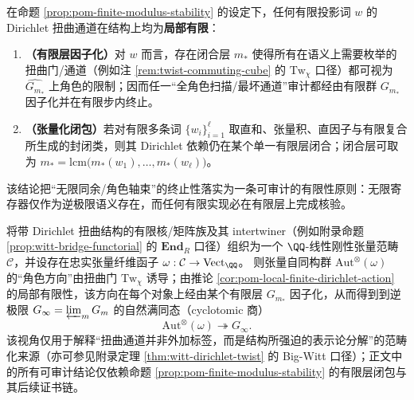 \begin{corollary}\label{cor:pom-local-finite-dirichlet-action}
在命题 \ref{prop:pom-finite-modulus-stability} 的设定下，任何有限投影词 \(w\) 的 Dirichlet 扭曲通道在结构上均为\textbf{局部有限}：
\begin{enumerate}
  \item \textbf{（有限层因子化）}对 \(w\) 而言，存在闭合层 \(m_\ast\) 使得所有在语义上需要枚举的扭曲门/通道（例如注 \ref{rem:twist-commuting-cube} 的 \(\mathrm{Tw}_\chi\) 口径）都可视为 \(\widehat{G_{m_\ast}}\) 上角色的限制；因而任一“全角色扫描/最坏通道”审计都经由有限群 \(G_{m_\ast}\) 因子化并在有限步内终止。
  \item \textbf{（张量化闭包）}若对有限多条词 \(\{w_i\}_{i=1}^{\ell}\) 取直和、张量积、直因子与有限复合所生成的封闭类，则其 Dirichlet 依赖仍在某个单一有限层闭合；闭合层可取为
  \(m_\ast=\mathrm{lcm}\bigl(m_\ast(w_1),\dots,m_\ast(w_\ell)\bigr)\)。
\end{enumerate}
该结论把“无限同余/角色轴束”的终止性落实为一条可审计的有限性原则：无限寄存器仅作为逆极限语义存在，而任何有限实现必在有限层上完成核验。
\end{corollary}

\begin{remark}\label{rem:pom-cyclotomic-quotient-tannakian}
将带 Dirichlet 扭曲结构的有限核/矩阵族及其 intertwiner（例如附录命题 \ref{prop:witt-bridge-functorial} 的 \(\mathbf{End}_R\) 口径）组织为一个 \(\QQ\)-线性刚性张量范畴 \(\mathcal{C}\)，并设存在忠实张量纤维函子 \(\omega:\mathcal{C}\to\mathrm{Vect}_{\QQ}\)。
则张量自同构群 \(\mathrm{Aut}^{\otimes}(\omega)\) 的“角色方向”由扭曲门 \(\mathrm{Tw}_\chi\) 诱导；由推论 \ref{cor:pom-local-finite-dirichlet-action} 的局部有限性，该方向在每个对象上经由某个有限层 \(G_{m_\ast}\) 因子化，从而得到到逆极限
\(
G_\infty=\varprojlim_m G_m
\)
的自然满同态（cyclotomic 商）
\[
\mathrm{Aut}^{\otimes}(\omega)\twoheadrightarrow G_\infty.
\]
该视角仅用于解释“扭曲通道并非外加标签，而是结构所强迫的表示论分解”的范畴化来源（亦可参见附录定理 \ref{thm:witt-dirichlet-twist} 的 Big-Witt 口径）；正文中的所有可审计结论仅依赖命题 \ref{prop:pom-finite-modulus-stability} 的有限层闭包与其后续证书链。
\end{remark}

